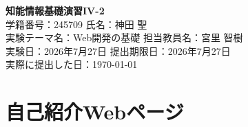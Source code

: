 \documentclass[a4paper,11pt]{jlreq}
\begin{document}
\begin{titlepage}
    \centering
    \vspace*{5cm} %
    {\Huge \bfseries 知能情報基礎演習IV-2} \\[1.5cm]

    {\Large 学籍番号：245709 }
    {\Large 氏名：神田 聖} \\[0.5cm]

    {\Large 実験テーマ名：Web開発の基礎 }
    {\Large 担当教員名：宮里 智樹} \\[0.5cm]

    {\Large 実験日：2026年7月27日 }
    {\Large 提出期限日：2026年7月27日 } \\[0.5cm]
    {\Large 実際に提出した日：\today} \\[0.5cm]
\end{titlepage}

\newpage

\section{自己紹介Webページ}
\end{document}

